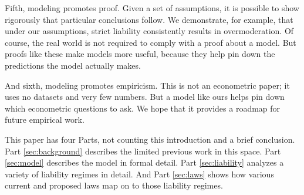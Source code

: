 Fifth, modeling promotes proof. Given a set of assumptions, it is possible to show rigorously that particular conclusions follow. We demonstrate, for example, that under our assumptions, strict liability consistently results in overmoderation. Of course, the real world is not required to comply with a proof about a model. But proofs like these make models more useful, because they help pin down the predictions the model actually makes.

And sixth, modeling promotes empiricism. This is not an econometric paper; it uses no datasets and very few numbers. But a model like ours helps pin down which econometric questions to ask. We hope that it provides a roadmap for future empirical work.

This paper has four Parts, not counting this introduction and a brief conclusion. Part \ref{sec:background} describes the limited previous work in this space. Part \ref{sec:model} describes the model in formal detail. Part \ref{sec:liability} analyzes a variety of liability regimes in detail. And Part \ref{sec:laws} shows how various current and proposed laws map on to those liability regimes.